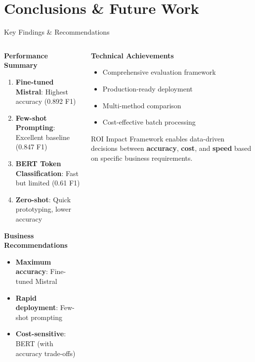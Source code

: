 \documentclass[aspectratio=169]{beamer}
\begin{document}
\section{Conclusions \& Future Work}

\begin{frame}{Key Findings \& Recommendations}
\begin{columns}
\begin{column}{0.5\textwidth}
\textbf{Performance Summary}
\begin{enumerate}
\item \textbf{Fine-tuned Mistral}: Highest accuracy (0.892 F1)
\item \textbf{Few-shot Prompting}: Excellent baseline (0.847 F1)
\item \textbf{BERT Token Classification}: Fast but limited (0.61 F1)
\item \textbf{Zero-shot}: Quick prototyping, lower accuracy
\end{enumerate}

\vspace{0.3cm}
\textbf{Business Recommendations}
\begin{itemize}
\item \textbf{Maximum accuracy}: Fine-tuned Mistral
\item \textbf{Rapid deployment}: Few-shot prompting
\item \textbf{Cost-sensitive}: BERT (with accuracy trade-offs)
\end{itemize}
\end{column}
\begin{column}{0.5\textwidth}
\textbf{Technical Achievements}
\begin{itemize}
\item Comprehensive evaluation framework
\item Production-ready deployment
\item Multi-method comparison
\item Cost-effective batch processing
\end{itemize}

\vspace{0.3cm}
\begin{alertblock}{ROI Impact}
Framework enables data-driven decisions between \textbf{accuracy}, \textbf{cost}, and \textbf{speed} based on specific business requirements.
\end{alertblock}
\end{column}
\end{columns}
\end{frame}
\end{document}
